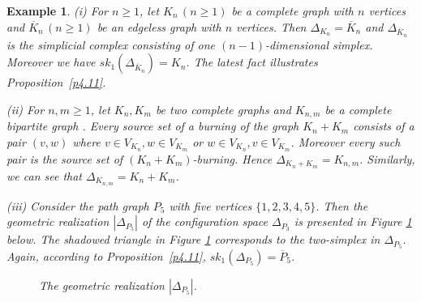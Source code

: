\documentclass[a4paper, 11pt]{article}
\newtheorem{example}[theorem]{Example}
\begin{document}
\begin{example}\label{e4.25} \rm (i) For $n\geq 1$, let $K_n\, (n\geq 1)$ be a complete graph with $n$ vertices and $\overline K_n\, (n\geq 1)$  be an edgeless graph with $n$ vertices.  Then $\Delta_{K_n}=\overline K_n$ and $\Delta_{\overline K_n} $  is the simplicial complex  consisting of one $(n-1)$-dimensional simplex.  Moreover we have $sk_1(\Delta_{\overline K_n})=K_n$. The latest fact illustrates Proposition~\ref{p4.11}.

(ii) For   $n,m\geq 1$, let $K_n, K_m$  be two complete graphs and  $K_{n, m}$  be a  complete bipartite graph .  Every  source set of a burning of the graph  $K_n+K_m$ consists of a pair $(v,w)$  where 
$v\in V_{K_n}, w\in V_{K_m}$ or   $w\in V_{K_n}, v\in V_{K_m}$.  Moreover every such pair is the source set of 
$(K_n+K_m)$-burning. Hence $\Delta_{K_n+K_m}=K_{n,m}$. Similarly, we can see that  $\Delta_{K_{n,m}}=K_n +K_m$. 

(iii) Consider the path graph $P_5$ with five vertices $\{1,2,3,4,5\}$.
Then the geometric realization $|\Delta_{P_5}|$ of the configuration space $\Delta_{P_3}$ is presented in Figure \ref{P5} below. The shadowed triangle in Figure \ref{P5} corresponds to the  two-simplex in $\Delta_{P_5}$. Again, according to Proposition~\ref{p4.11}, $sk_1(\Delta_{P_5})=\overline P_5$.
\begin{figure}[H]
    \centering
{}
   \caption{The geometric realization  $|\Delta_{P_5}|$.}
    \label{P5}
\end{figure} 
 

\end{example} 
\end{document}

